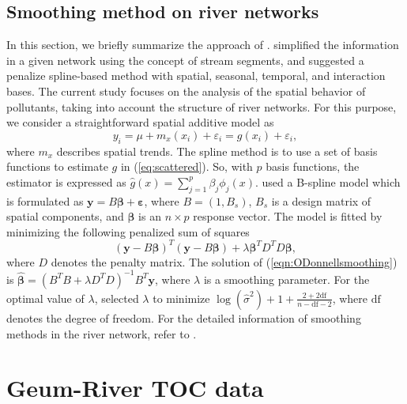 \documentclass[11pt,titlepage]{article}
\begin{document}
\subsection{Smoothing method on river networks}
In this section, we briefly summarize the approach of \cite{ODonnell2014}. \cite{ODonnell2014} simplified the information in a given network using the concept of stream segments, and suggested a penalize spline-based method with spatial, seasonal, temporal, and interaction bases. The current study focuses on the analysis of the spatial behavior of pollutants, taking into account the structure of river networks. For this purpose, we consider a straightforward spatial additive model as 
\begin{equation}\label{eqn:spatialsimpleadditive}
y_{i} = \mu + m_{x}(x_i) + \varepsilon_{i} = g(x_i) + \varepsilon_{i},
\end{equation}
where $m_x$ describes spatial trends. The spline method is to use a set of basis functions to estimate $g$ in  (\ref{eq:scattered}). So, with $p$ basis functions, the estimator is expressed as $\hat{g}(x) = \sum_{j=1}^{p}\beta_{j} \phi_{j}(x)$. \cite{ODonnell2014} used a B-spline model which is formulated as $\mathbf{y}=B\boldsymbol{\beta} +\boldsymbol{\varepsilon}$, where $B= (1, B_s)$, $B_{s}$ is a design matrix of spatial components, and $\boldsymbol{\beta}$ is an $n\times p$ response vector. The model is fitted by minimizing the following penalized sum of squares
\begin{equation}\label{eqn:ODonnellsmoothing}
(\mathbf{y}-B\boldsymbol{\beta})^{T}(\mathbf{y}-B\boldsymbol{\beta}) + \lambda\boldsymbol{\beta}^{T}D^{T}D\boldsymbol{\beta},
\end{equation} 
where $D$ denotes the penalty matrix. The solution of (\ref{eqn:ODonnellsmoothing}) is $\hat{\boldsymbol{\beta}} = (B^{T}B+ \lambda D^{T} D)^{-1}B^{T}\mathbf{y}$, where $\lambda$ is a smoothing parameter. For the optimal value of $\lambda$, \cite{ODonnell2014} selected $\lambda$ to minimize $\log(\hat{\sigma}^{2}) + 1 + \frac{2+2\text{df}}{n-\text{df}-2}$, where $\text{df}$ denotes the degree of freedom. For the detailed information of smoothing methods in the river network, refer to \cite{ODonnell2014}. 


\section{Geum-River TOC data}\label{sec:data}
\end{document}
